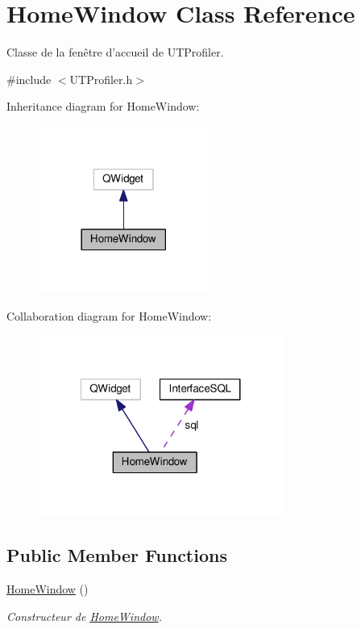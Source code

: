 \hypertarget{class_home_window}{\section{Home\-Window Class Reference}
\label{class_home_window}
}


Classe de la fenêtre d'accueil de U\-T\-Profiler.  




{\ttfamily \#include $<$U\-T\-Profiler.\-h$>$}



Inheritance diagram for Home\-Window\-:
\nopagebreak
\begin{figure}[H]
\begin{center}
\leavevmode
\includegraphics[width=158pt]{class_home_window__inherit__graph}
\end{center}
\end{figure}


Collaboration diagram for Home\-Window\-:
\nopagebreak
\begin{figure}[H]
\begin{center}
\leavevmode
\includegraphics[width=227pt]{class_home_window__coll__graph}
\end{center}
\end{figure}
\subsection*{Public Member Functions}
\begin{DoxyCompactItemize}
\item 
\hypertarget{class_home_window_ae2508edddb566e636a11fa47997acfec}{\hyperlink{class_home_window_ae2508edddb566e636a11fa47997acfec}{Home\-Window} ()}\label{class_home_window_ae2508edddb566e636a11fa47997acfec}

\begin{DoxyCompactList}\small\item\em Constructeur de \hyperlink{class_home_window}{Home\-Window}. \end{DoxyCompactList}\end{DoxyCompactItemize}
